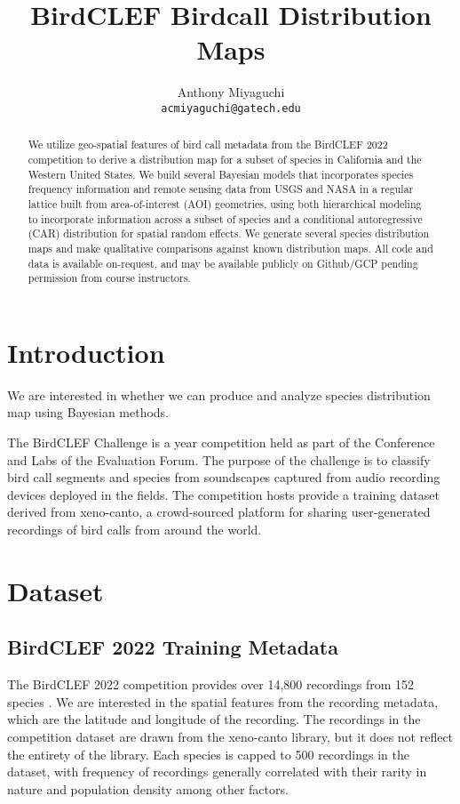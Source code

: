 \documentclass[notitlepage]{article}
\title{BirdCLEF Birdcall Distribution Maps}
\author{
    Anthony Miyaguchi \\  \texttt{acmiyaguchi@gatech.edu}
}
\begin{document}
\maketitle
\thispagestyle{empty}

\begin{abstract}

We utilize geo-spatial features of bird call metadata from the BirdCLEF 2022 competition to derive a distribution map for a subset of species in California and the Western United States.
We build several Bayesian models that incorporates species frequency information and remote sensing data from USGS and NASA in a regular lattice built from area-of-interest (AOI) geometries, using both hierarchical modeling to incorporate information across a subset of species and a conditional autoregressive (CAR) distribution for spatial random effects.
We generate several species distribution maps and make qualitative comparisons against known distribution maps.
All code and data is available on-request, and may be available publicly on Github/GCP pending permission from course instructors.

\end{abstract}

\section{Introduction}

We are interested in whether we can produce and analyze species distribution map using Bayesian methods.

The BirdCLEF Challenge is a year competition held as part of the Conference and Labs of the Evaluation Forum.
The purpose of the challenge is to classify bird call segments and species from soundscapes captured from audio recording devices deployed in the fields.
The competition hosts provide a training dataset derived from xeno-canto, a crowd-sourced platform for sharing user-generated recordings of bird calls from around the world.

\section{Dataset}
\subsection{BirdCLEF 2022 Training Metadata}

The BirdCLEF 2022 competition provides over 14,800 recordings from 152 species \cite{kahl2022overview}.
We are interested in the spatial features from the recording metadata, which are the latitude and longitude of the recording.
The recordings in the competition dataset are drawn from the xeno-canto library, but it does not reflect the entirety of the library.
Each species is capped to 500 recordings in the dataset, with frequency of recordings generally correlated with their rarity in nature and population density among other factors.
\end{document}

